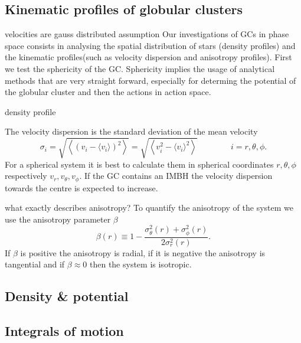 \subsection{Kinematic profiles of globular clusters}\label{kin_prof_theory}
\color{red} velocities are gauss distributed assumption \color{black}
Our investigations of \acp{GC} in phase space consists in analysing the spatial distribution of stars (density profiles) and the kinematic profiles(such as velocity dispersion and anisotropy profiles). First we test the sphericity of the \ac{GC}. Sphericity implies the usage of analytical methods that are very straight forward, especially for determing the potential of the globular cluster and then the actions in action space.\par \color{red} density profile \color{black} \par The velocity dispersion is the standard deviation of the mean velocity 
\begin{equation}
\sigma_i=\sqrt{\left\langle(v_i-\langle v_i\rangle)^2\right\rangle}=\sqrt{\left\langle v_i^2-\langle v_i\rangle^2\right\rangle} \qquad\qquad i=r,\theta,\phi.
\end{equation} For a spherical system it is best to calculate them in spherical coordinates \(r,\theta,\phi\) respectively \(v_r,v_{\theta},v_{\phi}\). If the \ac{GC} contains an \ac{IMBH} the velocity dispersion towards the centre is expected to increase. 
\par \color{red} what exactly describes anisotropy? \color{black} To quantify the anisotropy of the system we use the anisotropy parameter \(\beta\) 
\begin{equation}
\beta(r)\equiv1-\frac{\sigma_\theta ^2(r)+\sigma_\phi ^2(r)}{2\sigma_r ^2(r)}.
\end{equation} If \(\beta\) is positive the anisotropy is radial, if it is negative the anisotropy is tangential and if \(\beta\approx0\) then the system is isotropic.
\subsection{Density \& potential}\label{dens_pot_theory}
\subsection{Integrals of motion}\label{int_of_motion_theory}
